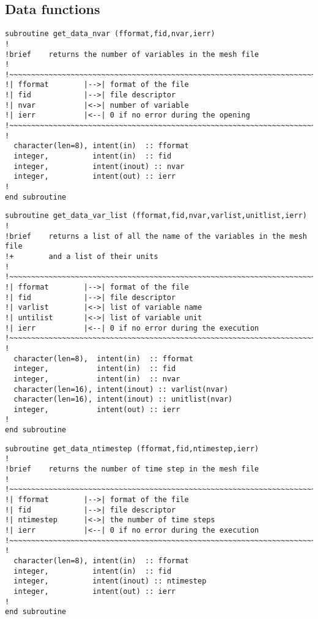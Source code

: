 \subsection{Data functions}
%
\begin{lstlisting}
subroutine get_data_nvar (fformat,fid,nvar,ierr)
!
!brief    returns the number of variables in the mesh file
!
!~~~~~~~~~~~~~~~~~~~~~~~~~~~~~~~~~~~~~~~~~~~~~~~~~~~~~~~~~~~~~~~~~~~~~~~
!| fformat        |-->| format of the file
!| fid            |-->| file descriptor
!| nvar           |<->| number of variable
!| ierr           |<--| 0 if no error during the opening
!~~~~~~~~~~~~~~~~~~~~~~~~~~~~~~~~~~~~~~~~~~~~~~~~~~~~~~~~~~~~~~~~~~~~~~~
!
  character(len=8), intent(in)  :: fformat
  integer,          intent(in)  :: fid
  integer,          intent(inout) :: nvar
  integer,          intent(out) :: ierr
!
end subroutine
\end{lstlisting}
%
\begin{lstlisting}
subroutine get_data_var_list (fformat,fid,nvar,varlist,unitlist,ierr)
!
!brief    returns a list of all the name of the variables in the mesh file
!+        and a list of their units
!
!~~~~~~~~~~~~~~~~~~~~~~~~~~~~~~~~~~~~~~~~~~~~~~~~~~~~~~~~~~~~~~~~~~~~~~~
!| fformat        |-->| format of the file
!| fid            |-->| file descriptor
!| varlist        |<->| list of variable name
!| untilist       |<->| list of variable unit
!| ierr           |<--| 0 if no error during the execution
!~~~~~~~~~~~~~~~~~~~~~~~~~~~~~~~~~~~~~~~~~~~~~~~~~~~~~~~~~~~~~~~~~~~~~~~
!
  character(len=8),  intent(in)  :: fformat
  integer,           intent(in)  :: fid
  integer,           intent(in)  :: nvar
  character(len=16), intent(inout) :: varlist(nvar)
  character(len=16), intent(inout) :: unitlist(nvar)
  integer,           intent(out) :: ierr
!
end subroutine
\end{lstlisting}
%
\begin{lstlisting}
subroutine get_data_ntimestep (fformat,fid,ntimestep,ierr)
!
!brief    returns the number of time step in the mesh file
!
!~~~~~~~~~~~~~~~~~~~~~~~~~~~~~~~~~~~~~~~~~~~~~~~~~~~~~~~~~~~~~~~~~~~~~~~
!| fformat        |-->| format of the file
!| fid            |-->| file descriptor
!| ntimestep      |<->| the number of time steps
!| ierr           |<--| 0 if no error during the execution
!~~~~~~~~~~~~~~~~~~~~~~~~~~~~~~~~~~~~~~~~~~~~~~~~~~~~~~~~~~~~~~~~~~~~~~~
!
  character(len=8), intent(in)  :: fformat
  integer,          intent(in)  :: fid
  integer,          intent(inout) :: ntimestep
  integer,          intent(out) :: ierr
!
end subroutine
\end{lstlisting}
